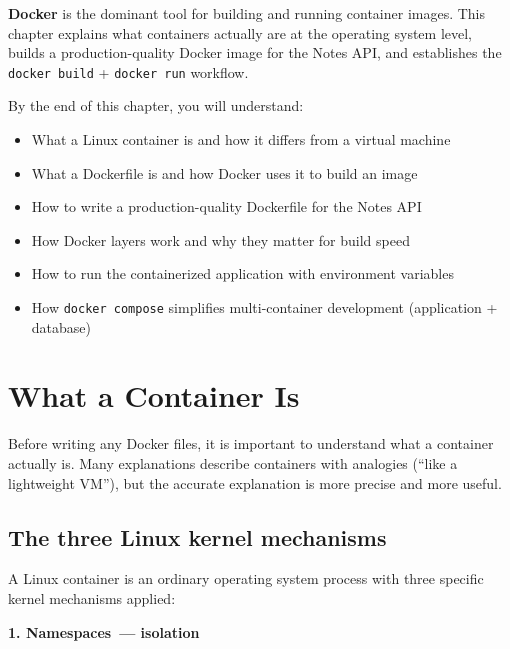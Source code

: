 \textbf{Docker} is the dominant tool for building and running container images. This chapter explains what containers actually are at the operating system level, builds a production-quality Docker image for the Notes API, and establishes the \texttt{docker\ build} + \texttt{docker\ run} workflow.

\begin{objectives}

By the end of this chapter, you will understand:

\begin{itemize}
\tightlist
\item
  What a Linux container is and how it differs from a virtual machine
\item
  What a Dockerfile is and how Docker uses it to build an image
\item
  How to write a production-quality Dockerfile for the Notes API
\item
  How Docker layers work and why they matter for build speed
\item
  How to run the containerized application with environment variables
\item
  How \texttt{docker\ compose} simplifies multi-container development (application + database)
\end{itemize}

\end{objectives}

\setcounter{section}{0}
\section{What a Container Is}\label{18-containerization:181-what-a-container-is}

Before writing any Docker files, it is important to understand what a container actually is. Many explanations describe containers with analogies (``like a lightweight VM''), but the accurate explanation is more precise and more useful.

\subsection*{The three Linux kernel mechanisms}\label{18-containerization:the-three-linux-kernel-mechanisms}

A Linux container is an ordinary operating system process with three specific kernel mechanisms applied:

\textbf{1. Namespaces~--- isolation}

